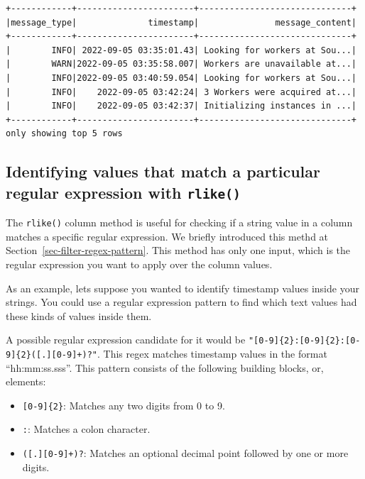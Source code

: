 \documentclass[
  11pt,
  letterpaper,
  DIV=11,
  numbers=noendperiod]{scrreprt}
\providecommand{\tightlist}{%
  \setlength{\itemsep}{0pt}\setlength{\parskip}{0pt}}\usepackage{longtable,booktabs,array}
\begin{document}
\begin{verbatim}
+------------+-----------------------+------------------------------+
|message_type|              timestamp|               message_content|
+------------+-----------------------+------------------------------+
|        INFO| 2022-09-05 03:35:01.43| Looking for workers at Sou...|
|        WARN|2022-09-05 03:35:58.007| Workers are unavailable at...|
|        INFO|2022-09-05 03:40:59.054| Looking for workers at Sou...|
|        INFO|    2022-09-05 03:42:24| 3 Workers were acquired at...|
|        INFO|    2022-09-05 03:42:37| Initializing instances in ...|
+------------+-----------------------+------------------------------+
only showing top 5 rows
\end{verbatim}

\hypertarget{identifying-values-that-match-a-particular-regular-expression-with-rlike}{%
\subsection{\texorpdfstring{Identifying values that match a particular
regular expression with
\texttt{rlike()}}{Identifying values that match a particular regular expression with rlike()}}\label{identifying-values-that-match-a-particular-regular-expression-with-rlike}}

The \texttt{rlike()} column method is useful for checking if a string
value in a column matches a specific regular expression. We briefly
introduced this methd at Section~\ref{sec-filter-regex-pattern}. This
method has only one input, which is the regular expression you want to
apply over the column values.

As an example, lets suppose you wanted to identify timestamp values
inside your strings. You could use a regular expression pattern to find
which text values had these kinds of values inside them.

A possible regular expression candidate for it would be
\texttt{"{[}0-9{]}\{2\}:{[}0-9{]}\{2\}:{[}0-9{]}\{2\}({[}.{]}{[}0-9{]}+)?"}.
This regex matches timestamp values in the format ``hh:mm:ss.sss''. This
pattern consists of the following building blocks, or, elements:

\begin{itemize}
\tightlist
\item
  \texttt{{[}0-9{]}\{2\}}: Matches any two digits from 0 to 9.
\item
  \texttt{:}: Matches a colon character.
\item
  \texttt{({[}.{]}{[}0-9{]}+)?}: Matches an optional decimal point
  followed by one or more digits.
\end{itemize}
\end{document}
